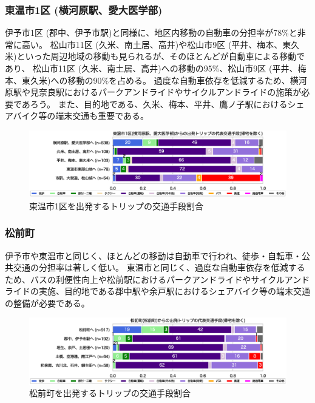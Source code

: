 \documentclass[a4paper,12pt, uplatex]{jsbook}
\begin{document}
\subsubsection{東温市1区 (横河原駅、愛大医学部)}
伊予市1区 (郡中、伊予市駅)と同様に、地区内移動の自動車の分担率が78\%と非常に高い。
松山市11区 (久米、南土居、高井)や松山市9区 (平井、梅本、東久米)といった周辺地域の移動も見られるが、そのほとんどが自動車による移動であり、
松山市11区 (久米、南土居、高井)への移動の95\%、松山市9区 (平井、梅本、東久米)への移動の90\%を占める。
過度な自動車依存を低減するため、横河原駅や見奈良駅におけるパークアンドライドやサイクルアンドライドの施策が必要であろう。
また、目的地である、久米、梅本、平井、鷹ノ子駅におけるシェアバイク等の端末交通も重要である。
%
\begin{figure}[H]
    \centering
    \includegraphics[width=1.0\textwidth]{picture/mode_share_東温市1区.eps}
    \caption{東温市1区を出発するトリップの交通手段割合}
    \label{fig:mode_share_toon1}
\end{figure}

\subsubsection{松前町}
伊予市や東温市と同じく、ほとんどの移動は自動車で行われ、徒歩・自転車・公共交通の分担率は著しく低い。
東温市と同じく、過度な自動車依存を低減するため、バスの利便性向上や松前駅におけるパークアンドライドやサイクルアンドライドの実施、目的地である郡中駅や余戸駅におけるシェアバイク等の端末交通の整備が必要である。
%
\begin{figure}[H]
    \centering
    \includegraphics[width=1.0\textwidth]{picture/mode_share_松前町.eps}
    \caption{松前町を出発するトリップの交通手段割合}
    \label{fig:mode_share_masaki}
\end{figure}
\end{document}
